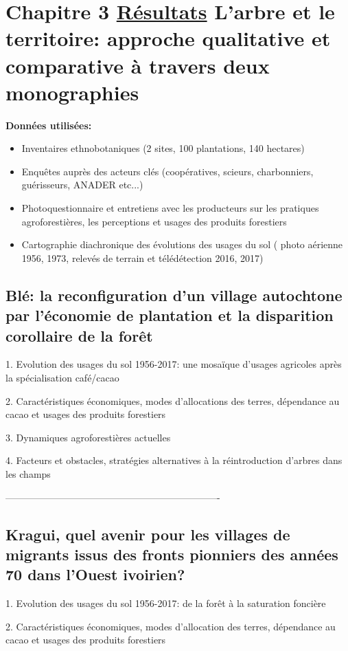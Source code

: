 \documentclass[a4paper,notitlepage]{article}
\begin{document}
\section*{Chapitre 3 \underline{Résultats} L'arbre et le territoire: approche qualitative et comparative à travers deux monographies}
\textbf{Données utilisées:}
\begin{itemize} 
\item{Inventaires ethnobotaniques (2 sites, 100 plantations, 140 hectares)}
\item{Enquêtes auprès des acteurs clés (coopératives, scieurs, charbonniers, guérisseurs, ANADER etc...)}
\item{Photoquestionnaire et entretiens avec les producteurs sur les pratiques agroforestières, les perceptions et usages des produits forestiers}
\item{Cartographie diachronique des évolutions des usages du sol ( photo aérienne 1956, 1973, relevés de terrain et télédétection 2016, 2017)}
\end{itemize}

\subsection*{Blé: la reconfiguration d'un village autochtone par l'économie de plantation et la disparition corollaire de la forêt}

1. Evolution des usages du sol 1956-2017: une mosaïque d'usages agricoles après la spécialisation café/cacao

2. Caractéristiques économiques, modes d'allocations des terres, dépendance au cacao et usages des produits forestiers

3. Dynamiques agroforestières actuelles

4. Facteurs et obstacles, stratégies alternatives à la réintroduction d'arbres dans les champs

-------------------------------------------------------------------

\subsection*{Kragui, quel avenir pour les villages de migrants issus des fronts pionniers des années 70 dans l'Ouest ivoirien?}

1. Evolution des usages du sol 1956-2017: de la forêt à la saturation foncière

2. Caractéristiques économiques, modes d'allocation des terres, dépendance au cacao et usages des produits forestiers
\end{document}
